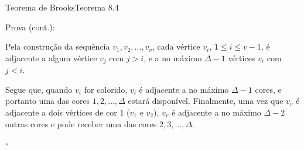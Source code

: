 \documentclass{beamer}
\begin{document}
\begin{frame}{Teorema de Brooks}{Teorema 8.4}

    
    \begin{block}{Prova (cont.):}
        \begin{sloppypar}
            \justifying
            Pela construção da sequência $v_1,v_2,\dots,v_v$, cada vértice $v_i$, $1 \leq i \leq v-1$, é adjacente a algum vértice $v_j$ com $j > i$, e a no máximo $\Delta-1$ vértices $v_i$ com $j<i$.
            
            \vskip 0.3cm
            Segue que, quando $v_i$ for colorido, $v_i$ é adjacente a no máximo $\Delta - 1$ cores, e portanto uma das cores $1,2,\dots,\Delta$ estará disponível.
            \vskip 0.3cm
            Finalmente, uma vez que $v_v$ é adjacente a dois vértices de cor $1$ ($v_1$ e $v_2$), $v_v$ é adjacente a no máximo $\Delta-2$ outras cores e pode receber uma das cores $2,3,\dots,\Delta$.
            
            \hfill\(\square\) 
            
        \end{sloppypar}
    \end{block}
        
\end{frame}


        
\end{document}
